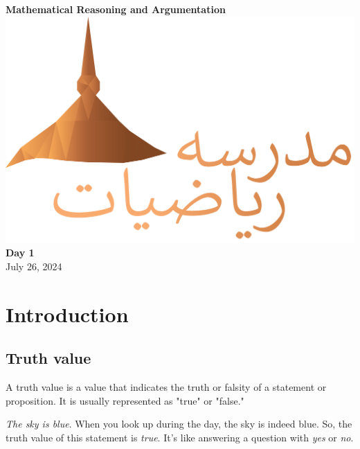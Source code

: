 \documentclass{article}
\theoremstyle{mytheoremstyle}
\theoremstyle{mytheoremstyle}
\theoremstyle{myexamplestyle}
\begin{document}
\begin{titlepage}
    \begin{center}
        {\Huge \textbf{Mathematical Reasoning and Argumentation}}\\
        \vfill
        \includegraphics[scale=0.25]{../assests/madarsa-logo.png}\\
        \vfill
        {\Large \textbf{Day 1}}\\
        {\Large {July 26, 2024}}
    \end{center}
\end{titlepage}

\tableofcontents

\newpage

\section{Introduction}

\subsection{Truth value}

\begin{definition}
    A truth value is a value that indicates the truth or falsity of a statement or proposition. It is usually represented as "true" or "false."
\end{definition}

\begin{example}
    \emph{The sky is blue}. When you look up during the day, the sky is indeed blue. So, the truth value of this statement is \emph{true}. It's like answering a question with \emph{yes} or \emph{no}.
\end{example}
\end{document}

